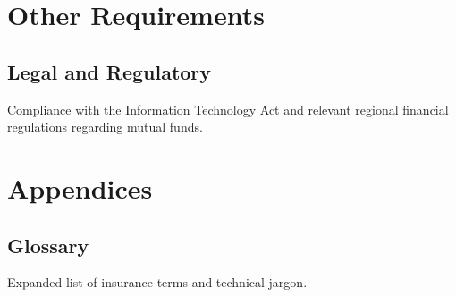\documentclass[12pt,a4paper]{article}
\begin{document}
\section{Other Requirements}

\subsection{Legal and Regulatory}
Compliance with the Information Technology Act and relevant regional financial regulations regarding mutual funds.

\section{Appendices}
\subsection{Glossary}
Expanded list of insurance terms and technical jargon.
\end{document}
